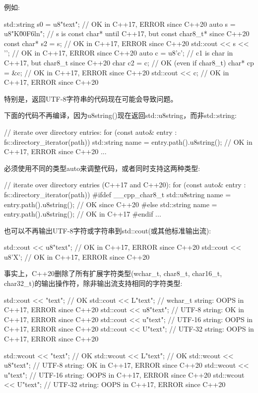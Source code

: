 
例如:

\begin{cpp}
std::string s0 = u8"text"; // OK in C++17, ERROR since C++20
auto s = u8"K\u00F6ln"; // s is const char* until C++17, but const char8_t* since C++20
const char* s2 = s; // OK in C++17, ERROR since C++20
std::cout << s << '\n'; // OK in C++17, ERROR since C++20
auto c = u8'c'; // c1 is char in C++17, but char8_t since C++20
char c2 = c; // OK (even if char8_t)
char* cp = &c; // OK in C++17, ERROR since C++20
std::cout << c; // OK in C++17, ERROR since C++20
\end{cpp}


特别是，返回UTF-8字符串的代码现在可能会导致问题。

下面的代码不再编译，因为u8string()现在返回std::u8string，而非std::string:

\begin{cpp}
// iterate over directory entries:
for (const auto& entry : fs::directory_iterator(path)) {
	std::string name = entry.path().u8string(); // OK in C++17, ERROR since C++20
	...
}
\end{cpp}

必须使用不同的类型auto来调整代码，或者同时支持这两种类型:

\begin{cpp}
// iterate over directory entries (C++17 and C++20):
for (const auto& entry : fs::directory_iterator(path)) {
#ifdef __cpp_char8_t
	std::u8string name = entry.path().u8string(); // OK since C++20
#else
	std::string name = entry.path().u8string(); // OK in C++17
#endif
	...
}
\end{cpp}


也可以不再输出UTF-8字符或字符串到std::cout(或其他标准输出流):

\begin{cpp}
std::cout << u8"text"; // OK in C++17, ERROR since C++20
std::cout << u8'X'; // OK in C++17, ERROR since C++20
\end{cpp}

事实上，C++20删除了所有扩展字符类型(wchar\_t, char8\_t, char16\_t, char32\_t)的输出操作符，除非输出流支持相同的字符类型:

\begin{cpp}
std::cout << "text"; // OK
std::cout << L"text"; // wchar_t string: OOPS in C++17, ERROR since C++20
std::cout << u8"text"; // UTF-8 string: OK in C++17, ERROR since C++20
std::cout << u"text"; // UTF-16 string: OOPS in C++17, ERROR since C++20
std::cout << U"text"; // UTF-32 string: OOPS in C++17, ERROR since C++20

std::wcout << "text"; // OK
std::wcout << L"text"; // OK
std::wcout << u8"text"; // UTF-8 string: OK in C++17, ERROR since C++20
std::wcout << u"text"; // UTF-16 string: OOPS in C++17, ERROR since C++20
std::wcout << U"text"; // UTF-32 string: OOPS in C++17, ERROR since C++20
\end{cpp}

